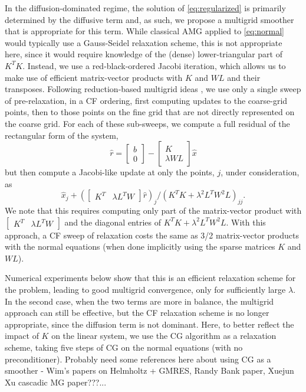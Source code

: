 In the diffusion-dominated regime, the solution of
\eqref{eq:regularized} is primarily determined by the diffusive term
and, as such, we propose a multigrid smoother that is appropriate for
this term.  While classical AMG applied to \eqref{eq:normal} would
typically use a Gauss-Seidel relaxation scheme, this is not
appropriate here, since it would require knowledge of the (dense)
lower-triangular part of $K^TK$.  Instead, we use a red-black-ordered
Jacobi iteration, which allows us to make use of efficient
matrix-vector products with $K$ and $WL$ and their transposes.
Following reduction-based multigrid ideas \cite{}, we use only a
single sweep of pre-relaxation, in a CF ordering, first computing
updates to the coarse-grid points, then to those points on the fine
grid that are not directly represented on the coarse grid.  For each
of these sub-sweeps, we compute a full residual of the rectangular
form of the system,
\[
\hat{r} = \left[\begin{array}{c} b \\ 0 \end{array}\right] -
\left[\begin{array}{c} K \\ \lambda WL\end{array}\right]\hat{x}
\]
but then compute a Jacobi-like update at only the points, $j$, under
consideration, as
\[
\hat{x}_j + {\left(\left[\begin{array}{cc} K^T & \lambda
      L^TW\end{array}\right]\hat{r}\right)_j}/{ \left(K^TK +
  \lambda^2L^TW^2L\right)_{jj}}.
\]
We note that this requires computing only part of the matrix-vector
product with $\left[\begin{array}{cc} K^T & \lambda
    L^TW\end{array}\right]$ and the diagonal entries of $K^TK +
\lambda^2L^TW^2L$.  With this approach, a CF sweep of relaxation costs
the same as 3/2 matrix-vector products with the normal equations (when
done implicitly using the sparse matrices $K$ and $WL$).

Numerical experiments below show that this is an efficient relaxation
scheme for the problem, leading to good multigrid convergence, only
for sufficiently large $\lambda$.  In the second case, when the two
terms are more in balance, the multigrid approach can still be
effective, but the CF relaxation scheme is no longer appropriate,
since the diffusion term is not dominant.  Here, to better reflect the
impact of $K$ on the linear system, we use the CG algorithm as a
relaxation scheme, taking five steps of CG on the normal equations
(with no preconditioner).  Probably need some references here about
using CG as a smoother - Wim's papers on Helmholtz + GMRES, Randy Bank
paper, Xuejun Xu cascadic MG paper???...

